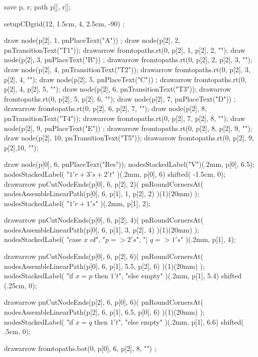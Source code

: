 
\usemodule[commDiag]

\startMPpage
save p, r; path p[], r[];

setupCDgrid(12, 1.5cm, 4, 2.5cm, -90) ;

draw node(p[2],  1, pnPlaceText("A")) ;
draw node(p[2],  2, pnTransitionText("T1"));
drawarrow fromtopaths.rt(0, p[2], 1, p[2], 2, "");
draw node(p[2],  3, pnPlaceText("B")) ;
drawarrow fromtopaths.rt(0, p[2], 2, p[2], 3, "");
draw node(p[2],  4, pnTransitionText("T2"));
drawarrow fromtopaths.rt(0, p[2], 3, p[2], 4, "");
draw node(p[2],  5, pnPlaceText("C")) ;
drawarrow fromtopaths.rt(0, p[2], 4, p[2], 5, "");
draw node(p[2],  6, pnTransitionText("T3"));
drawarrow fromtopaths.rt(0, p[2], 5, p[2], 6, "");
draw node(p[2],  7, pnPlaceText("D")) ;
drawarrow fromtopaths.rt(0, p[2], 6, p[2], 7, "");
draw node(p[2],  8, pnTransitionText("T4"));
drawarrow fromtopaths.rt(0, p[2], 7, p[2], 8, "");
draw node(p[2],  9, pnPlaceText("E")) ;
drawarrow fromtopaths.rt(0, p[2], 8, p[2], 9, "");
draw node(p[2], 10, pnTransitionText("T5"));
drawarrow fromtopaths.rt(0, p[2], 9, p[2],10, "");

draw node(p[0], 6, pnPlaceText("Res"));
nodesStackedLabel("V")(.2mm, p[0], 6.5);
nodesStackedLabel(
  "$1'r+3's+2't$"
)(.2mm, p[0], 6) shifted( -1.5cm, 0);
drawarrow pnCutNodeEnds(p[0], 6, p[2], 2)(
  pnRoundCornersAt(
    nodesAssembleLinearPath(p[0], 6, p[1], 1, p[2], 2)
  )(1)(20mm)
);
nodesStackedLabel(
  "$1'r+1's$"
)(.2mm, p[1], 2);

drawarrow pnCutNodeEnds(p[0], 6, p[2], 4)(
  pnRoundCornersAt(
    nodesAssembleLinearPath(p[0], 6, p[1], 3, p[2], 4)
  )(1)(20mm)
);
nodesStackedLabel(
  "case $x$ of", "$p => 2's$", "| $q => 1's$"
)(.2mm, p[1], 4);

drawarrow pnCutNodeEnds(p[0], 6, p[2], 6)(
  pnRoundCornersAt(
    nodesAssembleLinearPath(p[0], 6, p[1], 5.5, p[2], 6)
  )(1)(20mm)
);
nodesStackedLabel(
  "if $x=p$ then $1't$", "else empty"
)(.2mm, p[1], 5.4) shifted (.25cm, 0);

drawarrow pnCutNodeEnds(p[2], 6, p[0], 6)(
  pnRoundCornersAt(
    nodesAssembleLinearPath(p[2], 6, p[1], 6.5, p[0], 6)
  )(1)(20mm)
);
nodesStackedLabel(
  "if $x=q$ then $1't$", "else empty"
)(.2mm, p[1], 6.6) shifted( .5cm, 0);

drawarrow fromtopaths.bot(0, p[0], 6, p[2], 8, "") ;

